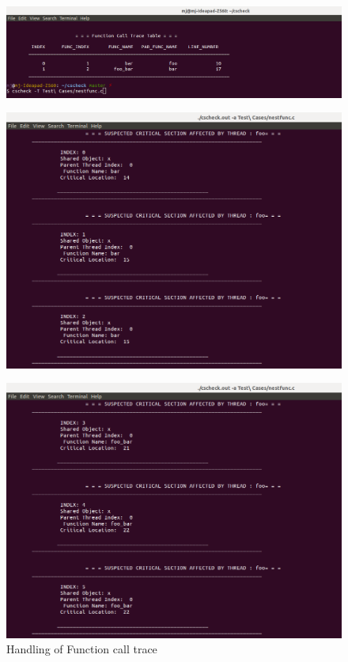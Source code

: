 \begin{figure}[H]
\centering
\includegraphics[scale=0.4]{Snaps/util_5-12_out1.png}
\label{<<Label>>}
\end{figure}
\begin{figure}[H]
\centering
\includegraphics[scale=0.4]{Snaps/util_5-12_out2.png}
\label{<<Label>>}
\end{figure}

\begin{figure}[H]
\centering
\includegraphics[scale=0.4]{Snaps/util_5-12_out3.png}
\caption{ Handling of Function call trace }
\label{<<Label>>}
\end{figure}

